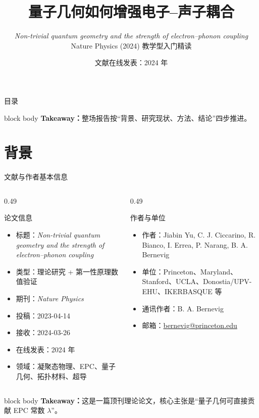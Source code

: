 \documentclass[aspectratio=169,11pt,UTF8]{ctexbeamer}
\title{量子几何如何增强电子--声子耦合}
\subtitle{\textit{Non-trivial quantum geometry and the strength of electron--phonon coupling}\\Nature Physics (2024) 教学型入门精读}
\author{}
\institute{基于主文与 Supplementary Information 重构}
\date{文献在线发表：2024 年}
\newcommand{\takeaway}[1]{%
  \vfill
  \begin{beamercolorbox}[wd=\textwidth,sep=0.7ex,rounded=true]{block body}
    \small\textbf{Takeaway：}#1
  \end{beamercolorbox}
}
\begin{document}
\begin{frame}
  \titlepage
\end{frame}

\begin{frame}{目录}
  \tableofcontents
  \takeaway{整场报告按“背景、研究现状、方法、结论”四步推进。}
\end{frame}

\section{背景}

\begin{frame}{文献与作者基本信息}
  \footnotesize
  \begin{columns}[T]
    \begin{column}{0.49\textwidth}
      \begin{block}{论文信息}
        \begin{itemize}
          \item 标题：\textit{Non-trivial quantum geometry and the strength of electron--phonon coupling}
          \item 类型：理论研究 + 第一性原理数值验证
          \item 期刊：\textit{Nature Physics}
          \item 投稿：2023-04-14
          \item 接收：2024-03-26
          \item 在线发表：2024 年
          \item 领域：凝聚态物理、EPC、量子几何、拓扑材料、超导
        \end{itemize}
      \end{block}
    \end{column}
    \begin{column}{0.49\textwidth}
      \begin{block}{作者与单位}
        \begin{itemize}
          \item 作者：Jiabin Yu, C. J. Ciccarino, R. Bianco, I. Errea, P. Narang, B. A. Bernevig
          \item 单位：Princeton、Maryland、Stanford、UCLA、Donostia/UPV-EHU、IKERBASQUE 等
          \item 通讯作者：B. A. Bernevig
          \item 邮箱：\href{mailto:bernevig@princeton.edu}{bernevig@princeton.edu}
        \end{itemize}
      \end{block}
    \end{column}
  \end{columns}
  \takeaway{这是一篇顶刊理论论文，核心主张是“量子几何可直接贡献 EPC 常数 $\lambda$”。}
\end{frame}
\end{document}
